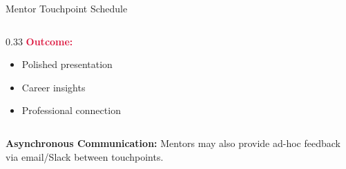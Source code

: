\begin{frame}{Mentor Touchpoint Schedule}
\begin{columns}
\begin{column}{0.33\textwidth}
\textcolor{crimson}{\textbf{Outcome:}}
\begin{itemize}
\item Polished presentation
\item Career insights
\item Professional connection
\end{itemize}
\end{column}
\end{columns}

\vspace{0.3cm}

\textbf{Asynchronous Communication:} Mentors may also provide ad-hoc feedback via email/Slack between touchpoints.
\end{frame}


